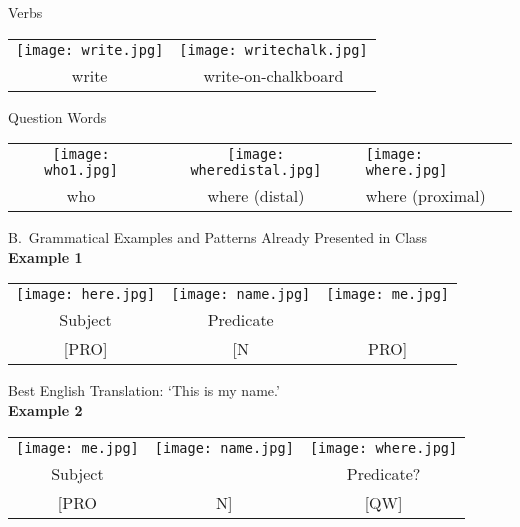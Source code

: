 \documentclass{tufte-book}
\begin{document}
\noindent Verbs

\begin{table}[h!]

\begin{tabular}{c c }
\texttt{[image: write.jpg]} & \texttt{[image: writechalk.jpg]}  \\
\footnotesize write & \footnotesize write-on-chalkboard \\

\end{tabular}
\end{table}

\noindent Question Words

\begin{table*}[h!]

\begin{tabular}{c c l }
\texttt{[image: who1.jpg]} & \texttt{[image: wheredistal.jpg]} &\texttt{[image: where.jpg]} \\
\footnotesize who  & \footnotesize where (distal) & \footnotesize where (proximal) \\

\end{tabular}
\end{table*}
\newpage
\noindent B.~Grammatical Examples and Patterns Already Presented in Class\\

\vspace{0.25cm} \noindent \textbf{Example 1}
\begin{table*}[h!]

\begin{tabular}{c |c c }
\texttt{[image: here.jpg]} & \texttt{[image: name.jpg]} &\texttt{[image: me.jpg]} \\
\footnotesize Subject & \footnotesize Predicate & \\
\footnotesize [PRO] & \footnotesize [N & \footnotesize PRO] \\

\end{tabular}
\end{table*}

 Best English Translation: `This is my name.'\\
 
\vspace{0.25cm} \noindent \textbf{Example 2}
\begin{table*}[h!]

\begin{tabular}{c c |c }
\texttt{[image: me.jpg]} & \texttt{[image: name.jpg]} &\texttt{[image: where.jpg]} \\
\footnotesize Subject &  & \footnotesize Predicate? \\
\footnotesize [PRO & \footnotesize N] & \footnotesize [QW] \\

\end{tabular}
\end{table*}
\end{document}
